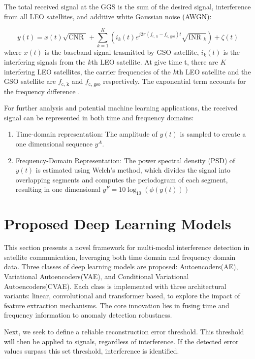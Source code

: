 \documentclass[12pt]{article}
\begin{document}
The total received signal at the GGS is the sum of the desired signal, interference from all LEO satellites, and additive white Gaussian noise (AWGN):

$$
    y(t ) = x(t ) \sqrt{\text{CNR }} + \sum_{k=1}^{K } \left(i_{k}(t )e^{j 2 \pi (f_{\text{c, k}}- f_{\text{c, gso}})t} \sqrt{\text{INR }_{k}}\right) + \zeta(t)
$$
where $x(t)$ is the baseband signal trasmitted by GSO satellite, $i_{k}(t)$ is the interfering signals from the $k$th LEO satellite.
At give time t, there are $K$ interfering LEO satellites, the carrier frequencies of the $k $th LEO satellite and the GSO satellite are $f_{\text{c, k}}$ and $f_{\text{c, gso}}$ respectively. The exponential term accounts for the frequency difference .

For further analysis and potential machine learning applications, the received signal can be represented in both time and frequency domains:
\begin{enumerate}
    \item Time-domain representation: The amplitude of $y(t)$ is sampled to create a one dimensional sequence $y^{A}$.
    \item Frequency-Domain Representation: The power spectral density (PSD) of $y(t)$ is estimated using Welch's method, which divides the signal into overlapping segments and computes the periodogram of each segment, resulting in one dimensional $y^{F } = 10 \log_{10}(\phi(y(t )))$
\end{enumerate}

\section{Proposed Deep Learning Models}

This section presents a novel framework for multi-modal interference detection in satellite communication, leveraging both time domain and frequency domain data. Three classes of deep learning models are proposed: Autoencoders(AE), Variational Autoencoders(VAE), and Conditional Variational Autoencoders(CVAE). Each class is implemented with three architectural variants: linear, convolutional and transformer based, to explore the impact of feature extraction mechanisms. The core innovation lies in fusing time and frequency information to anomaly detection robustness.

Next, we seek to define a reliable reconstruction error threshold. This threshold will then be applied to signals, regardless of interference. If the detected error values surpass this set threshold, interference is identified.
\end{document}
